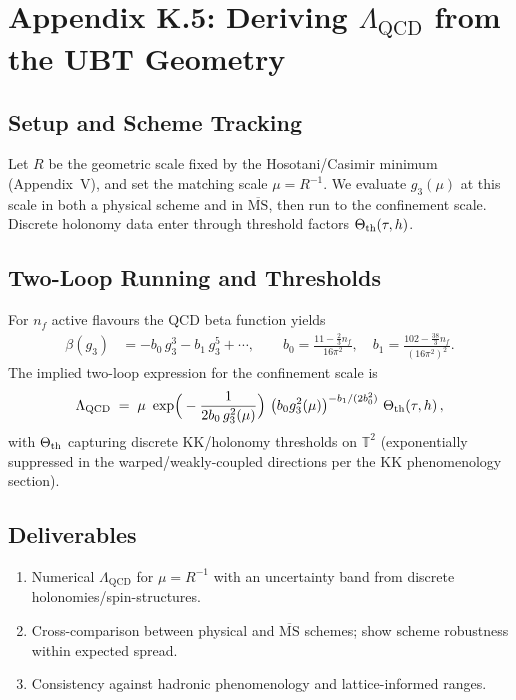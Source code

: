\appendix
\section*{Appendix K.5: Deriving \texorpdfstring{$\Lambda_{\mathrm{QCD}}$}{Lambda\_QCD} from the UBT Geometry}

\subsection*{Setup and Scheme Tracking}
Let $R$ be the geometric scale fixed by the Hosotani/Casimir minimum (Appendix~V), and set the matching scale $\mu=R^{-1}$.
We evaluate $g_3(\mu)$ at this scale in both a physical scheme and in $\overline{\mathrm{MS}}$, then run to the confinement scale.
Discrete holonomy data enter through threshold factors $\Theta_{\rm th}(\tau,h)$.

\subsection*{Two-Loop Running and Thresholds}
For $n_f$ active flavours the QCD beta function yields
\begin{align}
  \beta(g_3) &= -b_0\,g_3^3 - b_1\,g_3^5 + \cdots,\qquad
  b_0=\frac{11-\tfrac{2}{3}n_f}{16\pi^2},\quad
  b_1=\frac{102-\tfrac{38}{3}n_f}{(16\pi^2)^2}.
\end{align}
The implied two-loop expression for the confinement scale is
\begin{equation}
  \Lambda_{\mathrm{QCD}} \;=\; \mu\ \exp\!\Big(-\frac{1}{2b_0\,g_3^2(\mu)}\Big)\ \big(b_0 g_3^2(\mu)\big)^{-b_1/(2b_0^2)}\ \Theta_{\rm th}(\tau,h)\,,
\end{equation}
with $\Theta_{\rm th}$ capturing discrete KK/holonomy thresholds on $\mathbb{T}^2$ (exponentially suppressed in the warped/weakly-coupled directions per the KK phenomenology section).

\subsection*{Deliverables}
\begin{enumerate}
  \item Numerical $\Lambda_{\mathrm{QCD}}$ for $\mu=R^{-1}$ with an uncertainty band from discrete holonomies/spin-structures.
  \item Cross-comparison between physical and $\overline{\mathrm{MS}}$ schemes; show scheme robustness within expected spread.
  \item Consistency against hadronic phenomenology and lattice-informed ranges.
\end{enumerate}

